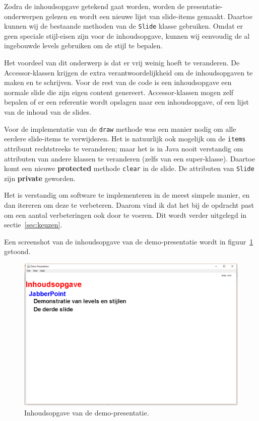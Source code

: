 \documentclass[a4paper]{article}
\newcommand{\code}[1]{\lstinline[columns=fixed]{#1}}
\newcommand{\diagram}[3][1.3]{
	\begin{figure}[!htb]
	 \caption{#3}
	 \label{diagram:#2}
	 \makebox[\textwidth][c]{\texttt{[image: Diagrams/\#2.pdf]}}%
	\end{figure}
}
\begin{document}
		Zodra de inhoudsopgave getekend gaat worden, worden de presentatie-onder\-werpen gelezen en wordt een nieuwe lijst van slide-items gemaakt.
		Daartoe kunnen wij de bestaande methoden van de \code{Slide} klasse gebruiken.
		Omdat er geen speciale stijl-eisen zijn voor de inhoudsopgave, kunnen wij eenvoudig de al ingebouwde levels gebruiken om de stijl te bepalen.


		Het voordeel van dit onderwerp is dat er vrij weinig hoeft te veranderen.
		De Accessor-klassen krijgen de extra verantwoordelijkheid om de inhoudsopgaven te maken en te schrijven.
		Voor de rest van de code is een inhoudsopgave een normale slide die zijn eigen content genereert.
		Accessor-klassen mogen zelf bepalen of er een referentie wordt opslagen naar een inhoudsopgave, of een lijst van de inhoud van de slides.

		Voor de implementatie van de \code{draw} methode was een manier nodig om alle eerdere slide-items te verwijderen.
		Het is natuurlijk ook mogelijk om de \code{items} attribuut rechtstreeks te veranderen;
		maar het is in Java nooit verstandig om attributen van andere klassen te veranderen (zelfs van een super-klasse).
		Daartoe komt een nieuwe \textbf{protected} methode \code{clear} in de slide.
		De attributen van \code{Slide} zijn \textbf{private} geworden.

		Het is verstandig om software te implementeren in de meest simpele manier, en dan itereren om deze te verbeteren.
		Daarom vind ik dat het bij de opdracht past om een aantal verbeteringen ook door te voeren.
		Dit wordt verder uitgelegd in sectie~\ref{sec:keuzen}.

		Een screenshot van de inhoudsopgave van de demo-presentatie wordt in figuur~\ref{fig:master} getoond.
		\begin{figure}[!htb]
		 \caption{
			Inhoudsopgave van de demo-presentatie.\label{fig:master}
		 }
		 \centering \includegraphics[width=\textwidth]{Screenshots/master.png}
		\end{figure}
\end{document}
